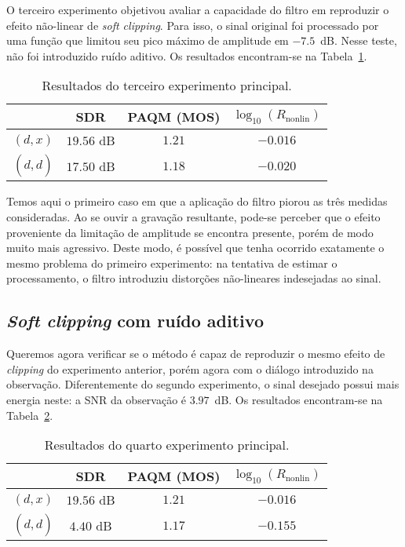 O terceiro experimento objetivou avaliar a capacidade do filtro em reproduzir o efeito
não-linear de \textit{soft clipping}. Para isso, o sinal original foi processado por
uma função que limitou seu pico máximo de amplitude em $-7.5$~dB. Nesse teste, não foi
introduzido ruído aditivo. Os resultados encontram-se na
Tabela~\ref{tab:correntropy:experiment-3}. {\def\arraystretch{1.25}\tabcolsep=10pt
\begin{table}[!ht]
	\centering
	\caption[Resultados do terceiro experimento: \textit{soft clipping}]{Resultados do terceiro experimento principal.}
	\label{tab:correntropy:experiment-3}
	\begin{tabular}{cccc}
		\toprule
		               & SDR        & PAQM (MOS) & $\log_{10}(R_{\text{nonlin}})$ \\
		\midrule
		$(d, x)$       & $19.56$ dB & $1.21$     & $-0.016$                       \\
		$(d, \hat{d})$ & $17.50$ dB & $1.18$     & $-0.020$                       \\ \bottomrule
	\end{tabular}
\end{table}
}

Temos aqui o primeiro caso em que a aplicação do filtro piorou as três medidas
consideradas. Ao se ouvir a gravação resultante, pode-se perceber que o efeito
proveniente da limitação de amplitude se encontra presente, porém de modo muito mais
agressivo. Deste modo, é possível que tenha ocorrido exatamente o mesmo problema do
primeiro experimento: na tentativa de estimar o processamento, o filtro introduziu
distorções não-lineares indesejadas ao sinal.

\subsection{\textit{Soft clipping} com ruído aditivo}

Queremos agora verificar se o método é capaz de reproduzir o mesmo efeito de
\textit{clipping} do experimento anterior, porém agora com o diálogo introduzido na
observação. Diferentemente do segundo experimento, o sinal desejado possui mais energia
neste: a SNR da observação é $3.97$~dB. Os resultados encontram-se na
Tabela~\ref{tab:correntropy:experiment-4}. {\def\arraystretch{1.25}\tabcolsep=10pt
\begin{table}[!ht]
	\centering
	\caption[Resultados do quarto experimento: \textit{soft clipping} com ruído aditivo]{Resultados do quarto experimento principal.}
	\label{tab:correntropy:experiment-4}
	\begin{tabular}{cccc}
		\toprule
		               & SDR        & PAQM (MOS) & $\log_{10}(R_{\text{nonlin}})$ \\
		\midrule
		$(d, x)$       & $19.56$ dB & $1.21$     & $-0.016$                       \\
		$(d, \hat{d})$ & $4.40$ dB  & $1.17$     & $-0.155$                       \\ \bottomrule
	\end{tabular}
\end{table}
}

